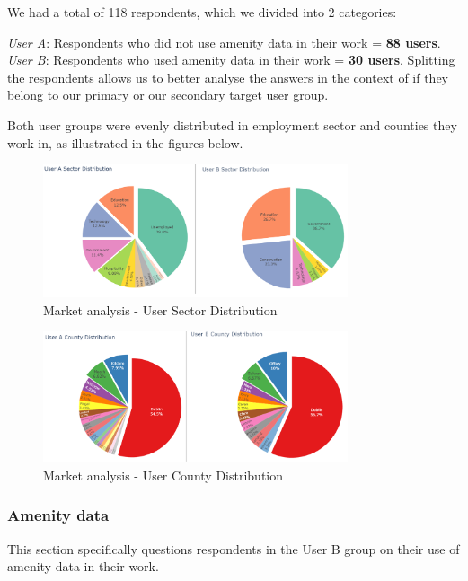 \documentclass[preview]{standalone}
\begin{document}
We had a total of 118 respondents, which we divided into 2 categories:

\emph{User A}: Respondents who did not use amenity data in their work = \textbf{88 users}.
\emph{User B}: Respondents who used amenity data in their work = \textbf{30 users}.
Splitting the respondents allows us to better analyse the answers in the context of if they belong to our primary or our secondary target user group.

Both user groups were evenly distributed in employment sector and counties they work in, as illustrated in the figures below.

\begin{figure}[htbp]
    \centering{}{}
    \includegraphics[width=0.8\textwidth]{images/mr-sector-distribution.png}
    \caption{Market analysis - User Sector Distribution}
\end{figure}

\begin{figure}[htbp]
    \centering{}{}
    \includegraphics[width=0.8\textwidth]{images/mr-county-distribution.png}
    \caption{Market analysis - User County Distribution}
\end{figure}

\newpage{}

\subsubsection{Amenity data}
This section specifically questions respondents in the User B group on their use of amenity data in their work.
\end{document}
